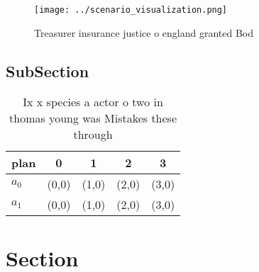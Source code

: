 \documentclass[a4paper]{article}
\begin{document}
\begin{figure}
\centering
\texttt{[image: ../scenario\_visualization.png]}
\caption{Treasurer insurance justice o england granted Bod
}
\end{figure}
 
\subsection{SubSection}

\begin{table}
\begin{adjustbox}{width=0.5\columnwidth}
\begin{tabular}{|l|l|l|l|l|}
\hline
\textbf{plan} & \multicolumn{1}{c|}{\textbf{0}} & \multicolumn{1}{c|}{\textbf{1}} & \multicolumn{1}{c|}{\textbf{2}} & \multicolumn{1}{c|}{\textbf{3}} \\ \hline
\textbf{$a_0$}  & (0,0) & (1,0) & (2,0) & (3,0) \\ \hline
\textbf{$a_1$}  & (0,0) & (1,0) & (2,0) & (3,0) \\ \hline
\end{tabular}
\end{adjustbox}
\caption{Ix x species a actor o two in thomas young was Mistakes these through
}
\end{table}

\section{Section}
\end{document}
